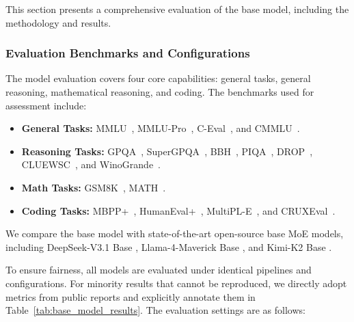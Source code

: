 \newcommand{\red}[1]{\textcolor{red}{#1}}

This section presents a comprehensive evaluation of the \longcat base model, including the methodology and results.

\subsubsection{Evaluation Benchmarks and Configurations}
The model evaluation covers four core capabilities: general tasks, general reasoning, mathematical reasoning, and coding. The benchmarks used for assessment include:

\begin{itemize}
    \item \textbf{General Tasks:} MMLU~\citep{hendrycks2021measuringmassivemultitasklanguage}, MMLU-Pro~\citep{wang2024mmluprorobustchallengingmultitask}, C-Eval~\citep{huang2023ceval}, and CMMLU~\citep{li2023cmmlu}.

    \item \textbf{Reasoning Tasks:} GPQA~\citep{rein2023gpqagraduatelevelgoogleproofqa}, SuperGPQA~\citep{pteam2025supergpqascalingllmevaluation}, BBH~\citep{BBH}, PIQA~\citep{piqa}, DROP~\citep{drop}, CLUEWSC~\citep{clue}, and WinoGrande~\citep{winogrande}.
    
    \item \textbf{Math Tasks:} GSM8K~\citep{cobbe2021gsm8k}, MATH~\citep{mathbenchmark}.

    \item \textbf{Coding Tasks:} MBPP+~\citep{humanevalmbppplus}, HumanEval+~\citep{humanevalmbppplus}, MultiPL-E~\citep{cassano2022multiplescalableextensibleapproach}, and CRUXEval~\citep{gu2024cruxevalbenchmarkcodereasoning}. 
\end{itemize}


We compare the \longcat base model with state-of-the-art open-source base MoE models, including DeepSeek-V3.1 Base \citep{deepseekai2025deepseekv3technicalreport}, Llama-4-Maverick Base \citep{meta2025llama4}, and Kimi-K2 Base \citep{Kimi_K2_web_doc}.

To ensure fairness, all models are evaluated under identical pipelines and configurations. For minority results that cannot be reproduced, we directly adopt metrics from public reports and explicitly annotate them in Table~\ref{tab:base_model_results}. The evaluation settings are as follows:

